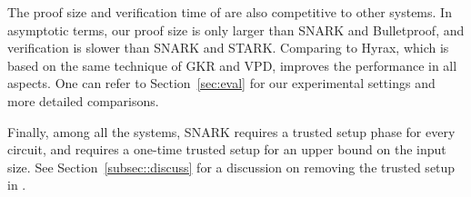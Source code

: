 The proof size and verification time of \name are also competitive to other systems. In asymptotic terms, our proof size is only larger than SNARK and Bulletproof, and verification is slower than SNARK and STARK. Comparing to Hyrax, which is based on the same technique of GKR and VPD, \name improves the performance in all aspects. One can refer to Section~\ref{sec:eval} for our experimental settings and more detailed comparisons. 
 

 
Finally, among all the systems, SNARK requires a trusted setup phase for every circuit, and \name requires a one-time trusted setup for an upper bound on the input size. See Section~\ref{subsec::discuss} for a discussion on removing the trusted setup in \name. 




